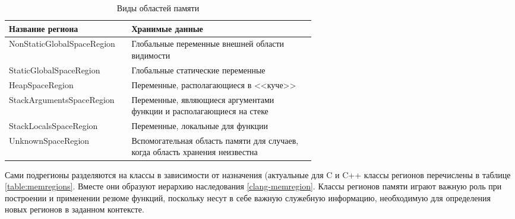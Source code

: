 \renewcommand\arraystretch{1.2}

\begin{table} [htbp]
  \centering
  \parbox{15cm}{\caption{Виды областей памяти}\label{table:regionspace}}
  \begin{tabular}{| l || p{0.6\linewidth} |}
  \hline
  \hline
  Название региона   & Хранимые данные \\
  \hline
  NonStaticGlobalSpaceRegion   & Глобальные переменные внешней области видимости  \\
  \hline
  StaticGlobalSpaceRegion      & Глобальные статические переменные    \\
  \hline
  HeapSpaceRegion  & Переменные, располагающиеся в <<куче>>    \\
  \hline
  StackArgumentsSpaceRegion & Переменные, являющиеся аргументами функции и располагающиеся на стеке   \\
  \hline
  StackLocalsSpaceRegion & Переменные, локальные для функции   \\
  \hline
  UnknownSpaceRegion & Вспомогательная область памяти для случаев, когда область хранения неизвестна \\
  \hline
  \hline
  \end{tabular}
\end{table}

Сами подрегионы разделяются на классы в зависимости от назначения (актуальные для C и C++ классы регионов перечислены в таблице \ref{table:memregions}. Вместе они образуют иерархию наследования \ref{clang-memregion}. Классы регионов памяти играют важную роль при построении и применении резюме функций, поскольку несут в себе важную служебную информацию, необходимую для определения новых регионов в заданном контексте.

